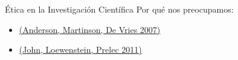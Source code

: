 \documentclass{beamer}
\begin{document}


\begin{frame}{Ética en la Investigación Científica}
Por qué nos preocupamos:
\begin{itemize}[<.->]
\item \href{http://www.jstor.org/stable/pdf/10.1525/jer.2007.2.4.3.pdf}{(Anderson, Martinson, De Vries 2007)}
\item \href{http://pss.sagepub.com/content/23/5/524}{(John, Loewenstein, Prelec 2011)}
\end{itemize}
\end{frame}
  
\end{document}
